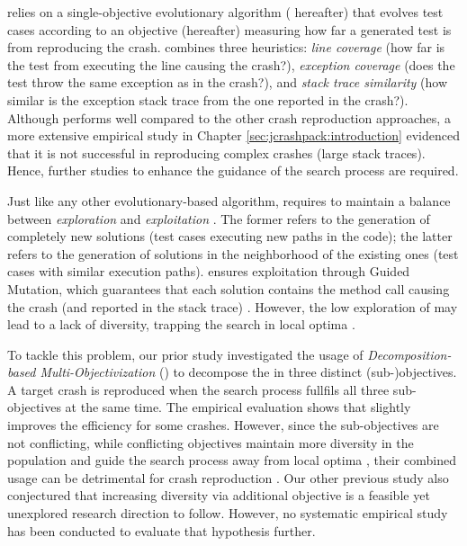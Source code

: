 \evocrash relies on a single-objective evolutionary algorithm (\textit{\SGGA} hereafter) that evolves test cases according to an objective (\CrashFunction hereafter) measuring how far a generated test is from reproducing the crash. \CrashFunction combines three heuristics: \textit{line coverage} (how far is the test from executing the line causing the crash?), \textit{exception coverage} (does the test throw the same exception as in the crash?), and \textit{stack trace similarity} (how similar is the exception stack trace from the one reported in the crash?). %
%
Although \SGGA performs well compared to the other crash reproduction approaches, a more extensive empirical study in Chapter \ref{sec:jcrashpack:introduction} evidenced that it is not successful in reproducing complex crashes (\ie large stack traces). Hence, further studies to enhance the guidance of the search process are required.

Just like any other evolutionary-based algorithm, \SGGA requires to maintain a balance between \textit{exploration} and \textit{exploitation} \cite{vcrepinvsek2013}. The former refers to the generation of completely new solutions (\ie test cases executing new paths in the code); the latter refers to the generation of solutions in the neighborhood of the existing ones (\ie test cases with similar execution paths). \SGGA ensures exploitation through Guided Mutation, which guarantees that each solution contains the method call causing the crash (and reported in the stack trace) \cite{Soltani2018a}. However, the low exploration of \SGGA may lead to a lack of diversity, trapping the search in local optima \cite{vcrepinvsek2013}.

To tackle this problem, our prior study \cite{Soltani2018b} investigated the usage of \textit{De\-com\-po\-si\-tion-based Multi-Objectivization} (\decomposition) to decompose the \CrashFunction in three distinct (sub-)objectives. A target crash is reproduced when the search process fullfils all three sub-objectives at the same time. The empirical evaluation shows that \decomposition slightly improves the efficiency for some crashes. 
However, since the sub-objectives are not conflicting, while conflicting objectives maintain more diversity in the population and guide the search process away from local optima \cite{jensen2004helper}, their combined usage can be detrimental for crash reproduction \cite{Soltani2018b}.
Our other previous study \cite{Derakhshanfar2020a} also conjectured that increasing diversity via additional objective is a feasible yet unexplored research direction to follow. However, no systematic empirical study has been conducted to evaluate that hypothesis further.

